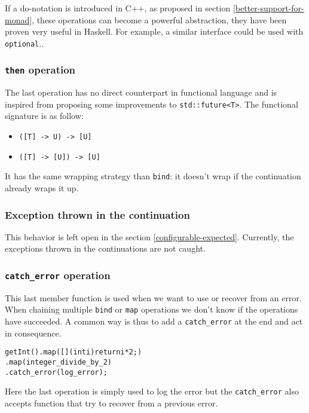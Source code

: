 \documentclass[a4paper,10pt]{article}
\newcommand{\cpp}[1]{\lstinline{#1}}
\begin{document}
If a do-notation is introduced in C++, as proposed in section \ref{better-support-for-monad}, these operations can become a powerful abstraction, they have been proven very useful in Haskell. For example, a similar interface could be used with \cpp{optional}..

\subsubsection{\cpp{then} operation}

The last operation has no direct counterpart in functional language and is inspired from \cite{ImprovementsAsync} proposing some improvements to \cpp{std::future<T>}. The functional signature is as follow:

\begin{itemize}
\item \cpp{([T] -> U) -> [U]}
\item \cpp{([T] -> [U]) -> [U]}
\end{itemize}

It has the same wrapping strategy than \cpp{bind}: it doesn't wrap if the continuation already wraps it up.

\subsubsection{Exception thrown in the continuation}

This behavior is left open in the section \ref{configurable-expected}. Currently, the exceptions thrown in the continuations are not caught.

\subsubsection{\cpp{catch_error} operation}

This last member function is used when we want to use or recover from an error. When chaining multiple \cpp{bind} or \cpp{map} operations we don't know if the operations have succeeded. A common way is thus to add a \cpp{catch_error} at the end and act in consequence.

\begin{alltt}
getInt().map([](int i){return i * 2;})
        .map(integer_divide_by_2)
        .catch_error(log_error);
\end{alltt}

\noindent
Here the last operation is simply used to log the error but the \cpp{catch_error} also accepts function that try to recover from a previous error.
\end{document}
